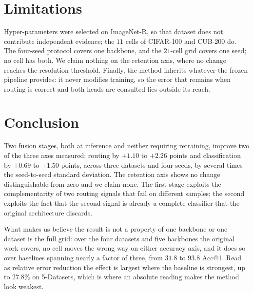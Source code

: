 \documentclass[runningheads]{llncs}
\begin{document}
\section{Limitations}
\label{sec:limits}

Hyper-parameters were selected on ImageNet-R, so that dataset does not
contribute independent evidence; the $11$ cells of CIFAR-100 and CUB-200 do.
The four-seed protocol covers one backbone, and the $21$-cell grid covers one
seed; no cell has both. We claim nothing on the retention axis, where no change
reaches the resolution threshold. Finally, the method inherits whatever the
frozen pipeline provides: it never modifies training, so the error that remains
when routing is correct and both heads are consulted lies outside its reach.

\section{Conclusion}

Two fusion stages, both at inference and neither requiring retraining, improve
two of the three axes measured: routing by $+1.10$ to $+2.26$ points and
classification by $+0.69$ to $+1.50$ points, across three datasets and four
seeds, by several times the seed-to-seed standard deviation. The retention axis
shows no change distinguishable from zero and we claim none. The first stage
exploits the complementarity of two routing signals that fail on different
samples; the second exploits the fact that the second signal is already a
complete classifier that the original architecture discards.

What makes us believe the result is not a property of one backbone or one
dataset is the full grid: over the four datasets and five backbones the original
work covers, no cell moves the wrong way on
either accuracy axis, and it does so over baselines spanning nearly a factor of
three, from $31.8$ to $93.8$ Acc@1. Read as relative error reduction the effect
is largest where the baseline is strongest, up to $27.8\%$ on 5-Datasets, which
is where an absolute reading makes the method look weakest.
\end{document}
